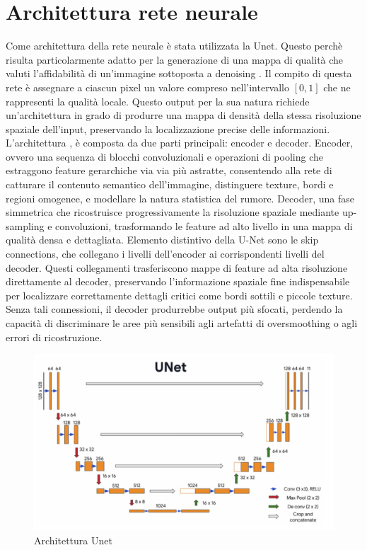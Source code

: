 \section{Architettura rete neurale}
Come architettura della rete neurale è stata utilizzata la Unet. Questo perchè risulta particolarmente adatto per la 
generazione di una mappa di qualità che valuti l'affidabilità di un'immagine sottoposta a denoising \cite{Vyver2025}. Il compito di 
questa rete è assegnare a ciascun pixel un valore compreso nell'intervallo $[0,1]$ che ne rappresenti la 
qualità locale. Questo output per la sua natura richiede un'architettura in grado di produrre una mappa di densità 
della stessa risoluzione spaziale dell'input, preservando la localizzazione precise delle informazioni. 
L'architettura \cite{ronneberger2015unetconvolutionalnetworksbiomedical}, è composta da due parti principali: encoder e decoder. 
Encoder, ovvero una sequenza di blocchi convoluzionali e operazioni di pooling che estraggono feature 
gerarchiche via via più astratte, consentendo alla rete di catturare il contenuto semantico dell’immagine, 
distinguere texture, bordi e regioni omogenee, e modellare la natura statistica del rumore.
Decoder, una fase simmetrica che ricostruisce progressivamente la risoluzione spaziale 
mediante up-sampling e convoluzioni, trasformando le feature ad alto livello in una mappa di 
qualità densa e dettagliata.
Elemento distintivo della U-Net sono le skip connections, che collegano i livelli dell’encoder ai corrispondenti 
livelli del decoder. Questi collegamenti trasferiscono mappe di feature ad alta risoluzione direttamente al decoder, 
preservando l’informazione spaziale fine indispensabile per localizzare correttamente dettagli critici come bordi 
sottili e piccole texture. Senza tali connessioni, il decoder produrrebbe output più sfocati, perdendo la capacità 
di discriminare le aree più sensibili agli artefatti di oversmoothing o agli errori di ricostruzione.
\begin{figure}[H]
  \centering
  \includegraphics[width=\textwidth]{utils/unet.png}
  \caption{Architettura Unet}
  \label{fig:ArchitetturaUnet}
\end{figure}
